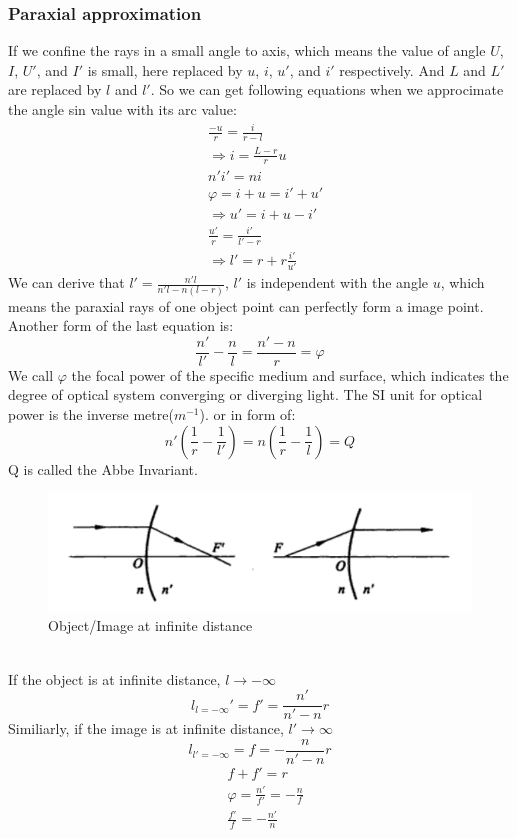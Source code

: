 \documentclass[../main.tex]{subfiles}
\begin{document}
	\subsubsection{Paraxial approximation}
	If we confine the rays in a small angle to axis, which means the value of angle $U$, $I$, $U'$, and $I'$ is small, here replaced by $u$, $i$, $u'$, and $i'$ respectively. And $L$ and $L'$ are replaced by $l$ and $l'$. So we can get following equations when we approcimate the angle sin value with its arc value:
	\begin{align}
		&\frac{-u}{r}=\frac{i}{r-l}\\
		&\Rightarrow i=\frac{L-r}{r}u\\
		&n'i'=ni\\
		&\varphi=i+u=i'+u'\\
		&\Rightarrow u'=i+u-i'\\
		&\frac{u'}{r}=\frac{i'}{l'-r}\\
		&\Rightarrow l'=r+r\frac{i'}{u'}
	\end{align}
	We can derive that $l'=\frac{n'l}{n'l-n(l-r)}$, $l'$ is independent with the angle $u$, which means the paraxial rays of one object point can perfectly form a image point.
	Another form of the last equation is:
	\begin{equation}
		\frac{n'}{l'}-\frac{n}{l}=\frac{n'-n}{r}=\varphi
	\end{equation}
	We call $\varphi$ the focal power of the specific medium and surface, which indicates the degree of optical system converging or diverging light. The SI unit for optical power is the inverse metre($m^{-1}$).
	or in form of:
	\begin{equation}
		n'\left(\frac{1}{r}-\frac{1}{l'}\right)=n\left(\frac{1}{r}-\frac{1}{l}\right)=Q
	\end{equation}
	Q is called the Abbe Invariant.\\
	\begin{figure}[h!]
		\centering
		\includegraphics[scale=0.7]{../graphics/Geometrical_optics7.png}
		\caption{Object/Image at infinite distance}
		\label{fig:infinite}
	\end{figure}\\
	If the object is at infinite distance, $l\to-\infty$
	\begin{equation}
		l_{l=-\infty}'=f'=\frac{n'}{n'-n}r
	\end{equation}
	Similiarly, if the image is at infinite distance, $l'\to\infty$
	\begin{equation}
		l_{l'=-\infty}=f=-\frac{n}{n'-n}r
	\end{equation}
	\begin{align}
		&f+f'=r\\
		&\varphi=\frac{n'}{f'}=-\frac{n}{f}\\
		&\frac{f'}{f}=-\frac{n'}{n}
	\end{align}
\end{document}
